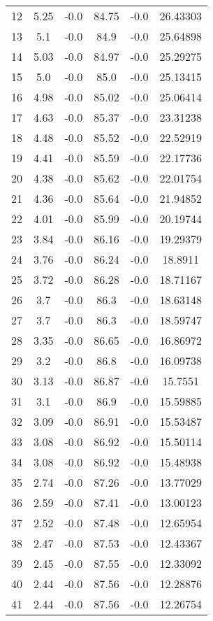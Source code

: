 \begin{center}
\begin{longtable}{c c c c c c}
    12 & 5.25 & -0.0 & 84.75 & -0.0 & 26.43303 \\
    13 & 5.1 & -0.0 & 84.9 & -0.0 & 25.64898 \\
    14 & 5.03 & -0.0 & 84.97 & -0.0 & 25.29275 \\
    15 & 5.0 & -0.0 & 85.0 & -0.0 & 25.13415 \\
    16 & 4.98 & -0.0 & 85.02 & -0.0 & 25.06414 \\
    17 & 4.63 & -0.0 & 85.37 & -0.0 & 23.31238 \\
    18 & 4.48 & -0.0 & 85.52 & -0.0 & 22.52919 \\
    19 & 4.41 & -0.0 & 85.59 & -0.0 & 22.17736 \\
    20 & 4.38 & -0.0 & 85.62 & -0.0 & 22.01754 \\
    21 & 4.36 & -0.0 & 85.64 & -0.0 & 21.94852 \\
    22 & 4.01 & -0.0 & 85.99 & -0.0 & 20.19744 \\
    23 & 3.84 & -0.0 & 86.16 & -0.0 & 19.29379 \\
    24 & 3.76 & -0.0 & 86.24 & -0.0 & 18.8911 \\
    25 & 3.72 & -0.0 & 86.28 & -0.0 & 18.71167 \\
    26 & 3.7 & -0.0 & 86.3 & -0.0 & 18.63148 \\
    27 & 3.7 & -0.0 & 86.3 & -0.0 & 18.59747 \\
    28 & 3.35 & -0.0 & 86.65 & -0.0 & 16.86972 \\
    29 & 3.2 & -0.0 & 86.8 & -0.0 & 16.09738 \\
    30 & 3.13 & -0.0 & 86.87 & -0.0 & 15.7551 \\
    31 & 3.1 & -0.0 & 86.9 & -0.0 & 15.59885 \\
    32 & 3.09 & -0.0 & 86.91 & -0.0 & 15.53487 \\
    33 & 3.08 & -0.0 & 86.92 & -0.0 & 15.50114 \\
    34 & 3.08 & -0.0 & 86.92 & -0.0 & 15.48938 \\
    35 & 2.74 & -0.0 & 87.26 & -0.0 & 13.77029 \\
    36 & 2.59 & -0.0 & 87.41 & -0.0 & 13.00123 \\
    37 & 2.52 & -0.0 & 87.48 & -0.0 & 12.65954 \\
    38 & 2.47 & -0.0 & 87.53 & -0.0 & 12.43367 \\
    39 & 2.45 & -0.0 & 87.55 & -0.0 & 12.33092 \\
    40 & 2.44 & -0.0 & 87.56 & -0.0 & 12.28876 \\
    41 & 2.44 & -0.0 & 87.56 & -0.0 & 12.26754 \\

\end{longtable}
\end{center}

